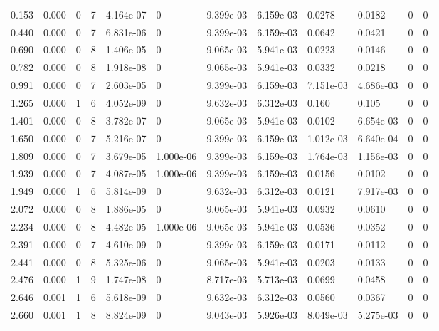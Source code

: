 \documentclass[preview]{standalone}
\begin{document}
{{\begin{tabular}{L{1.2cm}C{1.2cm} C{0.3cm}C{0.5cm} C{1.4cm}C{1.4cm} C{1.4cm}C{1.4cm} C{1.6cm}C{1.6cm} C{1.6cm}C{1.6cm}}
  0.153  &  0.000  & 0     &  7 &  4.164e-07  & 0  &  9.399e-03&   6.159e-03& 0.0278 & 0.0182   &  0 & 0  \\ 
  0.440  &  0.000  & 0     &  7 &  6.831e-06  & 0  &  9.399e-03&   6.159e-03& 0.0642 & 0.0421   &  0 & 0  \\ 
  0.690  &  0.000  & 0     &  8 &  1.406e-05  & 0  &  9.065e-03&   5.941e-03& 0.0223 & 0.0146   &  0 & 0  \\ 
  0.782  &  0.000  & 0     &  8 &  1.918e-08  & 0  &  9.065e-03&   5.941e-03& 0.0332 & 0.0218   &  0 & 0  \\ 
  0.991  &  0.000  & 0     &  7 &  2.603e-05  & 0  &  9.399e-03&   6.159e-03& 7.151e-03 & 4.686e-03   &  0 & 0  \\ 
  1.265  &  0.000  & 1     &  6 &  4.052e-09  & 0  &  9.632e-03&   6.312e-03& 0.160 & 0.105   &  0 & 0  \\ 
  1.401  &  0.000  & 0     &  8 &  3.782e-07  & 0  &  9.065e-03&   5.941e-03& 0.0102 & 6.654e-03   &  0 & 0  \\ 
  1.650  &  0.000  & 0     &  7 &  5.216e-07  & 0  &  9.399e-03&   6.159e-03& 1.012e-03 & 6.640e-04   &  0 & 0  \\ 
  1.809  &  0.000  & 0     &  7 &  3.679e-05  & 1.000e-06  &  9.399e-03&   6.159e-03& 1.764e-03 & 1.156e-03   &  0 & 0  \\ 
  1.939  &  0.000  & 0     &  7 &  4.087e-05  & 1.000e-06  &  9.399e-03&   6.159e-03& 0.0156 & 0.0102   &  0 & 0  \\ 
  1.949  &  0.000  & 1     &  6 &  5.814e-09  & 0  &  9.632e-03&   6.312e-03& 0.0121 & 7.917e-03   &  0 & 0  \\ 
  2.072  &  0.000  & 0     &  8 &  1.886e-05  & 0  &  9.065e-03&   5.941e-03& 0.0932 & 0.0610   &  0 & 0  \\ 
  2.234  &  0.000  & 0     &  8 &  4.482e-05  & 1.000e-06  &  9.065e-03&   5.941e-03& 0.0536 & 0.0352   &  0 & 0  \\ 
  2.391  &  0.000  & 0     &  7 &  4.610e-09  & 0  &  9.399e-03&   6.159e-03& 0.0171 & 0.0112   &  0 & 0  \\ 
  2.441  &  0.000  & 0     &  8 &  5.325e-06  & 0  &  9.065e-03&   5.941e-03& 0.0203 & 0.0133   &  0 & 0  \\ 
  2.476  &  0.000  & 1     &  9 &  1.747e-08  & 0  &  8.717e-03&   5.713e-03& 0.0699 & 0.0458   &  0 & 0  \\ 
  2.646  &  0.001  & 1     &  6 &  5.618e-09  & 0  &  9.632e-03&   6.312e-03& 0.0560 & 0.0367   &  0 & 0  \\ 
  2.660  &  0.001  & 1     &  8 &  8.824e-09  & 0  &  9.043e-03&   5.926e-03& 8.049e-03 & 5.275e-03   &  0 & 0  \\ 

\end{tabular}}}
\end{document}

